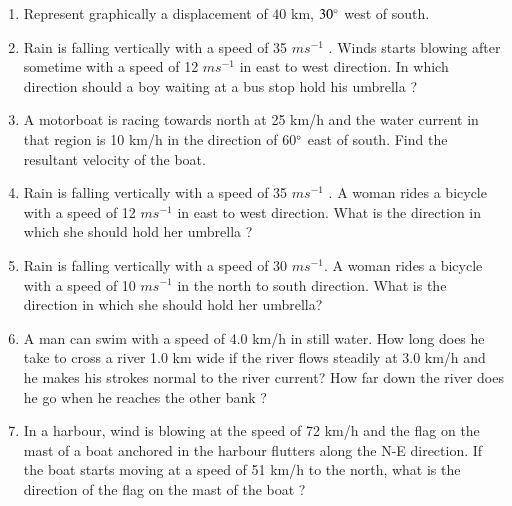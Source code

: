 \begin{enumerate}[label=\thesubsection.\arabic*, ref=\thesubsection.\theenumi]
\item Represent graphically a displacement of $40$ km,  $30\degree$ west of south.
	\item Rain is falling vertically with a speed of 35 $m s^{-1}$
. Winds starts blowing after sometime with a speed of 12 $m s^{-1}$ in
east to west direction. In which direction should a boy waiting at a bus stop hold his umbrella ?
%
\item A motorboat is racing towards north at 25 km/h and the water current in that region is 10 km/h in the direction of 60$\degree$ east of south. Find the resultant velocity of the boat.
\item Rain is falling vertically with a speed of 35 $m s^{-1}$
. A woman rides a bicycle with a speed of 12 $ms^{-1}$ in east to west
direction. What is the direction in which she should hold her umbrella ?
\item Rain is falling vertically with a speed of 30 $m s^{-1}$. A woman rides a bicycle with a speed  of 10 $m s^{-1}$ in the north to south direction. What is the direction in which she should
hold her umbrella?
\item A man can swim with a speed of 4.0 km/h in still water. How long does he take to cross a river 1.0 km wide if the river flows steadily at 3.0 km/h and he makes his strokes normal to the river current? How far down the river does he go when he reaches the other bank ?
\item In a harbour,  wind is blowing at the speed of 72 km/h and the flag on the mast of a boat anchored in the harbour flutters along the N-E direction. If the boat starts moving at a speed of 51 km/h to the north,  what is the direction of the flag on the mast of the boat ?

\end{enumerate}
